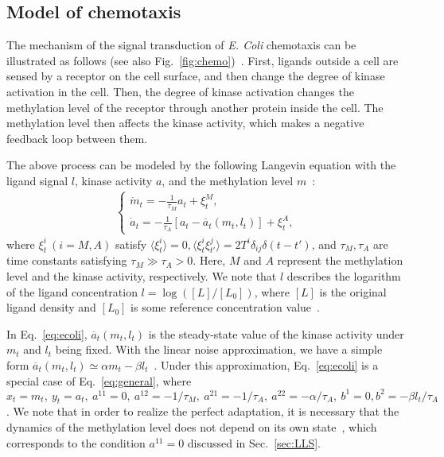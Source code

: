 \documentclass[%
 reprint,
 amsmath,amssymb,
 aps,
]{revtex4-1}
\newcommand{\fref}[1]{Fig.~\ref{fig:#1}}
\newcommand{\average}[1]{\ensuremath{\langle#1\rangle} }
\newcommand{\eref}[1]{Eq.~\eqref{#1}}
\theoremstyle{plain}
\begin{document}
\subsection{Model of chemotaxis}
The mechanism of the signal transduction of \textit{E. Coli} chemotaxis can be illustrated as follows (see also \fref{chemo})~\cite{Barkai1997}. First, ligands outside a cell are sensed by a receptor on the cell surface, and then change the degree of kinase activation in the cell. Then, the degree of kinase activation changes the methylation level of the receptor through another protein inside the cell. The methylation level  then affects the kinase activity, which makes a negative feedback loop between them.  

The above process can be modeled by the following Langevin equation with the ligand signal $l$, kinase activity $a$, and the methylation level $m$~\cite{Itoecoli,Lan2012,Tu2008,Barkai1997}:
\begin{eqnarray}
\begin{cases}
\dot{m}_t=-\frac{1}{\tau_M}a_t+\xi^M_t, \\
\dot{a}_t=-\frac{1}{\tau_A}\left[ a_t-\overline{a}_t(m_t,l_t) \right]+\xi^A_t, \label{eq:ecoli}
\end{cases}
\end{eqnarray}
where $\xi^i_t\ (i=M, A)$ satisfy $\average{\xi^i_t}=0, \average{\xi^i_t\xi^j_{t'}}=2T^i\delta_{ij}\delta(t-t')$, and $\tau_M,\tau_A$ are time constants satisfying $\tau_M\gg\tau_A>0$. Here, $M$ and $A$ represent the methylation level and the kinase activity, respectively. We note that $l$ describes the logarithm of the ligand concentration $l=\log([L]/[L_0])$, where $[L]$ is the original ligand density and $[L_0]$ is some reference concentration value~\cite{Tu2008}.

In \eref{eq:ecoli}, $\overline{a}_t(m_t,l_t)$ is the steady-state value of the kinase activity under $m_t$ and $l_t$ being fixed. With the linear noise approximation, we have a simple form $\overline{a}_t(m_t,l_t)\simeq\alpha m_t-\beta l_t$~\cite{Tostevin2009,Tu2008}. Under this approximation, \eref{eq:ecoli} is a special case of \eref{eq:general}, where $x_t=m_t,\ y_t=a_t,\ a^{11}=0,\ a^{12}=-1/\tau_M,\ a^{21}=-1/\tau_A,\ a^{22}=-\alpha/\tau_A,\ b^{1}=0, b^{2}=-\beta l_t/\tau_A$. We note that in order to realize the perfect adaptation, it is necessary that the dynamics of the methylation level does not depend on its own state~\cite{Tu2008}, which corresponds to the condition $a^{11}=0$ discussed in Sec.~\ref{sec:LLS}. 
\end{document}
